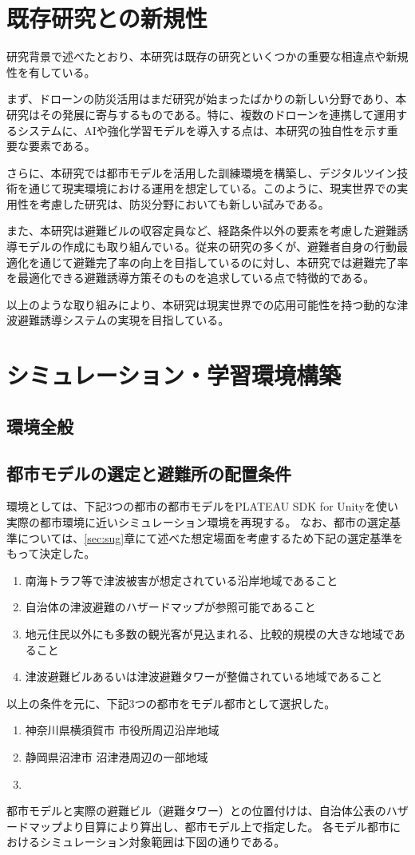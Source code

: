 \section{既存研究との新規性}  
研究背景で述べたとおり、本研究は既存の研究といくつかの重要な相違点や新規性を有している。

まず、ドローンの防災活用はまだ研究が始まったばかりの新しい分野であり、本研究はその発展に寄与するものである。特に、複数のドローンを連携して運用するシステムに、AIや強化学習モデルを導入する点は、本研究の独自性を示す重要な要素である。

さらに、本研究では都市モデルを活用した訓練環境を構築し、デジタルツイン技術を通じて現実環境における運用を想定している。このように、現実世界での実用性を考慮した研究は、防災分野においても新しい試みである。

また、本研究は避難ビルの収容定員など、経路条件以外の要素を考慮した避難誘導モデルの作成にも取り組んでいる。従来の研究の多くが、避難者自身の行動最適化を通じて避難完了率の向上を目指しているのに対し、本研究では避難完了率を最適化できる避難誘導方策そのものを追求している点で特徴的である。

以上のような取り組みにより、本研究は現実世界での応用可能性を持つ動的な津波避難誘導システムの実現を目指している。


\section{シミュレーション・学習環境構築}
\subsection{環境全般}
\subsection{都市モデルの選定と避難所の配置条件}
環境としては、下記3つの都市の都市モデルをPLATEAU SDK for Unityを使い実際の都市環境に近いシミュレーション環境を再現する。
なお、都市の選定基準については、\ref{sec:sug}章にて述べた想定場面を考慮するため下記の選定基準をもって決定した。
\begin{enumerate}
  \item 南海トラフ等で津波被害が想定されている沿岸地域であること
  \item 自治体の津波避難のハザードマップが参照可能であること
  \item 地元住民以外にも多数の観光客が見込まれる、比較的規模の大きな地域であること
  \item 津波避難ビルあるいは津波避難タワーが整備されている地域であること
\end{enumerate}
以上の条件を元に、下記3つの都市をモデル都市として選択した。
\begin{enumerate}
  \item 神奈川県横須賀市 市役所周辺沿岸地域
  \item 静岡県沼津市 沼津港周辺の一部地域
  \item %
\end{enumerate}
都市モデルと実際の避難ビル（避難タワー）との位置付けは、自治体公表のハザードマップより目算により算出し、都市モデル上で指定した。
各モデル都市におけるシミュレーション対象範囲は下図の通りである。

